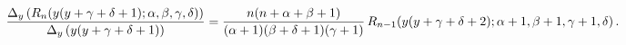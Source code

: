 \[\frac{\Delta_{y}\left(\mathop{R_{n}\/}\nolimits\!\left(y(y+\gamma+\delta+1);%
\alpha,\beta,\gamma,\delta\right)\right)}{\Delta_{y}\left(y(y+\gamma+\delta+1)%
\right)}=\frac{n(n+\alpha+\beta+1)}{(\alpha+1)(\beta+\delta+1)(\gamma+1)}\*%
\mathop{R_{n-1}\/}\nolimits\!\left(y(y+\gamma+\delta+2);\alpha+1,\beta+1,%
\gamma+1,\delta\right).\]